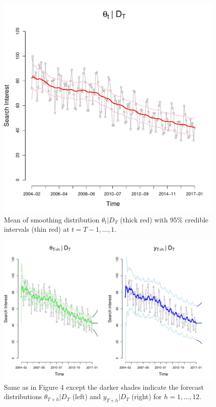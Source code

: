 \documentclass[12pt]{article}
\begin{document}
\begin{figure}[H]
\begin{center}
\includegraphics[scale=0.32]{figs/smooth.pdf}
\end{center}
\caption{Mean of smoothing distribution $\theta_t|D_T$ (thick red) with 95\% credible intervals (thin red) at $t=T-1,\ldots,1$.}
\end{figure}

\begin{figure}[H]
\begin{center}
\includegraphics[scale=0.32]{figs/forecast.pdf}
\end{center}
\caption{Same as in Figure 4 except the darker shades indicate the forecast distributions $\theta_{T+h}|D_T$ (left) and $y_{T+h}|D_T$ (right) for $h=1,\ldots,12$.}
\end{figure}
\end{document}

